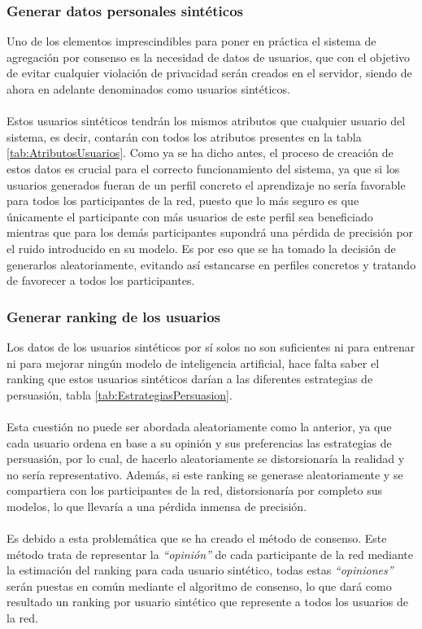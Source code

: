 \subsubsection{Generar datos personales sintéticos}\label{Consenso:Usuarios_Sinteticos}
Uno de los elementos imprescindibles para poner en práctica el sistema de agregación por consenso es la necesidad de datos de usuarios, que con el objetivo de evitar cualquier violación de privacidad serán creados en el servidor, siendo de ahora en adelante denominados como usuarios sintéticos.
\\ \\
Estos usuarios sintéticos tendrán los mismos atributos que cualquier usuario del sistema, es decir, contarán con todos los atributos presentes en la tabla \ref{tab:AtributosUsuarios}. Como ya se ha dicho antes, el proceso de creación de estos datos es crucial para el correcto funcionamiento del sistema, ya que si los usuarios generados fueran de un perfil concreto el aprendizaje no sería favorable para todos los participantes de la red, puesto que lo más seguro es que únicamente el participante con más usuarios de este perfil sea beneficiado mientras que para los demás participantes supondrá una pérdida de precisión por el ruido introducido en su modelo. Es por eso que se ha tomado la decisión de generarlos aleatoriamente, evitando así estancarse en perfiles concretos y tratando de favorecer a todos los participantes. 
\subsubsection{Generar ranking de los usuarios}
Los datos de los usuarios sintéticos por sí solos no son suficientes ni para entrenar ni para mejorar ningún modelo de inteligencia artificial, hace falta saber el ranking que estos usuarios sintéticos darían a las diferentes estrategias de persuasión, tabla \ref{tab:EstrategiasPersuasion}. 
\\ \\
Esta cuestión no puede ser abordada aleatoriamente como la anterior, ya que cada usuario ordena en base a su opinión y sus preferencias las estrategias de persuasión, por lo cual, de hacerlo aleatoriamente se distorsionaría la realidad y no sería representativo. Además, si este ranking se generase aleatoriamente y se compartiera con los participantes de la red, distorsionaría por completo sus modelos, lo que llevaría a una pérdida inmensa de precisión. 
\\ \\
Es debido a esta problemática que se ha creado el método de consenso. Este método trata de representar la \textit{``opinión''} de cada participante de la red mediante la estimación del ranking para cada usuario sintético, todas estas \textit{``opiniones''} serán puestas en común mediante el algoritmo de consenso, lo que dará como resultado un ranking por usuario sintético que represente a todos los usuarios de la red.
\newpage
